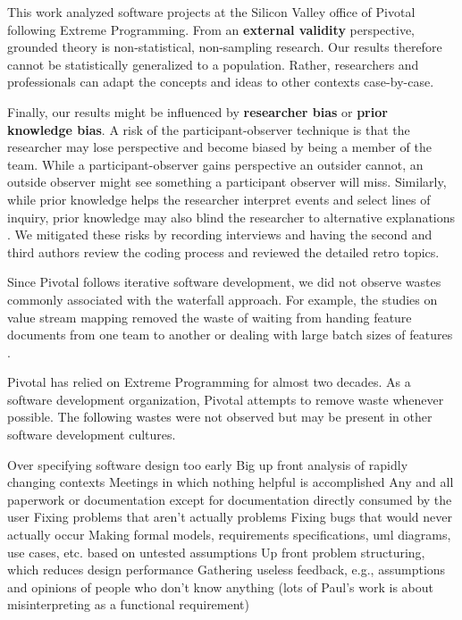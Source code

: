 This work analyzed software projects at the Silicon Valley office of Pivotal following Extreme Programming. From an \textbf{external validity} perspective, grounded theory is non-statistical, non-sampling research. Our results therefore cannot be statistically generalized to a population. Rather, researchers and professionals can adapt the concepts and ideas to other contexts case-by-case.

Finally, our results might be influenced by \textbf{researcher bias} or \textbf{prior knowledge bias}. A risk of the participant-observer technique is that the researcher may lose perspective and become biased by being a member of the team. While a participant-observer gains perspective an outsider cannot, an outside observer might see something a participant observer will miss. Similarly, while prior knowledge helps the researcher interpret events and select lines of inquiry, prior knowledge may also blind the researcher to alternative explanations \cite{GlaserIssues}. We mitigated these risks by recording interviews and having the second and third authors review the coding process and reviewed the detailed retro topics.

Since Pivotal follows iterative software development, we did not observe wastes commonly associated with the waterfall approach. For example, the studies on value stream mapping removed the waste of waiting from handing feature documents from one team to another or dealing with large batch sizes of features \cite{Ali2016, Khurum2014, Mujtaba2010}.

Pivotal has relied on Extreme Programming for almost two decades. As a  software development organization, Pivotal attempts to remove waste whenever possible. The following wastes were not observed but may be present in other software development cultures.

Over specifying software design too early
Big up front analysis of rapidly changing contexts
Meetings in which nothing helpful is accomplished
Any and all paperwork or documentation except for documentation directly consumed by the user
Fixing problems that aren't actually problems
Fixing bugs that would never actually occur
Making formal models, requirements specifications, uml diagrams, use cases, etc. based on untested assumptions
Up front problem structuring, which reduces design performance
Gathering useless feedback, e.g., assumptions and opinions of people who don't know anything (lots of Paul's work is about misinterpreting  as a functional requirement)  

